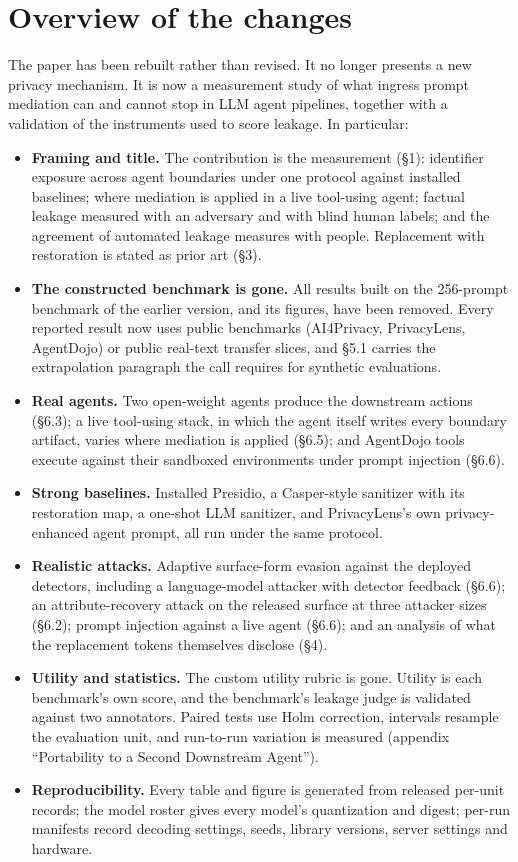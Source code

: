 \documentclass[10pt]{article}
\begin{document}
\section*{Overview of the changes}
The paper has been rebuilt rather than revised. It no longer presents a new privacy mechanism. It is now a
measurement study of what ingress prompt mediation can and cannot stop in LLM agent pipelines, together with a
validation of the instruments used to score leakage. In particular:
\begin{itemize}
\item \textbf{Framing and title.} The contribution is the measurement (\S1): identifier exposure across agent
  boundaries under one protocol against installed baselines; where mediation is applied in a live tool-using
  agent; factual leakage measured with an adversary and with blind human labels; and the agreement of automated
  leakage measures with people. Replacement with restoration is stated as prior art (\S3).
\item \textbf{The constructed benchmark is gone.} All results built on the 256-prompt benchmark of the earlier
  version, and its figures, have been removed. Every reported result now uses public benchmarks (AI4Privacy,
  PrivacyLens, AgentDojo) or public real-text transfer slices, and \S5.1 carries the extrapolation paragraph the
  call requires for synthetic evaluations.
\item \textbf{Real agents.} Two open-weight agents produce the downstream actions (\S6.3); a live tool-using
  stack, in which the agent itself writes every boundary artifact, varies where mediation is applied (\S6.5); and
  AgentDojo tools execute against their sandboxed environments under prompt injection (\S6.6).
\item \textbf{Strong baselines.} Installed Presidio, a Casper-style sanitizer with its restoration map, a one-shot
  LLM sanitizer, and PrivacyLens's own privacy-enhanced agent prompt, all run under the same protocol.
\item \textbf{Realistic attacks.} Adaptive surface-form evasion against the deployed detectors, including a
  language-model attacker with detector feedback (\S6.6); an attribute-recovery attack on the released surface at
  three attacker sizes (\S6.2); prompt injection against a live agent (\S6.6); and an analysis of what the
  replacement tokens themselves disclose (\S4).
\item \textbf{Utility and statistics.} The custom utility rubric is gone. Utility is each benchmark's own score,
  and the benchmark's leakage judge is validated against two annotators. Paired tests use Holm correction,
  intervals resample the evaluation unit, and run-to-run variation is measured (appendix ``Portability to a
  Second Downstream Agent'').
\item \textbf{Reproducibility.} Every table and figure is generated from released per-unit records; the model
  roster gives every model's quantization and digest; per-run manifests record decoding settings, seeds, library
  versions, server settings and hardware.
\end{itemize}
\end{document}
